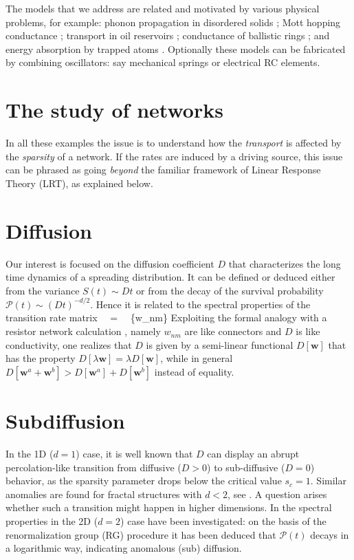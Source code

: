 The models that we address are related and motivated  
by various physical problems, for example: 
phonon propagation in disordered solids \cite{phn1,phn2,amir}; 
Mott hopping conductance \cite{mott,miller,AHL,Halp,pollak,VRHbook};
transport in oil reservoirs \cite{aa1,aa2};
conductance of ballistic rings \cite{kbd};
and energy absorption by trapped atoms \cite{kbw}. 
%
Optionally these models can be fabricated by combining oscillators: 
say mechanical springs or electrical RC elements. 

\section{The study of networks}
%   
In all these examples the issue is to understand how 
the {\em transport} is affected by the {\em sparsity} of a network.  
If the rates are induced by a driving source, this issue can be phrased as  
going {\em beyond} the familiar framework of Linear Response Theory (LRT), 
as explained below.  

\section{Diffusion} 
Our interest is focused on the diffusion coefficient $D$ that characterizes the 
long time dynamics of a spreading distribution. It can be defined or deduced 
either from the variance ${S(t) \sim Dt}$ or from the decay of the 
survival probability ${\mathcal{P}(t) \sim (D t)^{-d/2}}$. Hence it is 
related to the spectral properties of the transition rate matrix 
%
\beq
{} \ \ = \ \ \{w_{nm}\}
\eeq
%
Exploiting the formal analogy with a resistor network calculation \cite{miller},  
namely $w_{nm}$ are like connectors and $D$ is like conductivity, 
one realizes that $D$ is given by a semi-linear functional $D[\bm{w}]$ 
that has the property ${D[\lambda \bm{w}] = \lambda D[\bm{w}]}$, 
while in general ${D[\bm{w}^a+\bm{w}^b] > D[\bm{w}^a]+D[\bm{w}^b]}$ instead of equality.      


\section{Subdiffusion}
In the 1D ($d{=}1$) case, it is well known \cite{alexander} that $D$ can display an abrupt 
percolation-like transition from diffusive (${D>0}$) to sub-diffusive (${D=0}$) 
behavior, as the sparsity parameter drops below the critical value ${s_c=1}$.
Similar anomalies are found for fractal structures with ${d<2}$, see \cite{granek,havlin}. 
A question arises whether such a transition might happen in higher dimensions.  
In \cite{amir} the spectral properties in the 2D ($d{=}2$) case 
have been investigated: on the basis of the renormalization group (RG) procedure 
it has been deduced that $\mathcal{P}(t)$ decays in a logarithmic way, 
indicating anomalous (sub) diffusion.  


